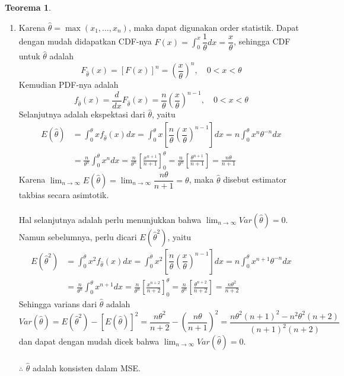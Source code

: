 \documentclass{exam}
\newtheorem{teorema}{Teorema}
\begin{document}
\begin{enumerate}
\begin{solution}
\begin{itemize}
\begin{teorema}
            \end{teorema}
        \end{itemize}
        \begin{enumerate}
            \item Karena $\hat{\theta} = \max(x_1,\dots,x_n)$, maka dapat digunakan order statistik. Dapat dengan mudah didapatkan CDF-nya $\displaystyle F(x) = \int_0^x \dfrac{1}{\theta}dx = \dfrac{x}{\theta}$, sehingga CDF untuk $\hat{\theta}$ adalah
            \[F_{\hat{\theta}}(x) = [F(x)]^n = \left(\dfrac{x}{\theta}\right)^n, \quad 0 < x < \theta\]
            Kemudian PDF-nya adalah
            \[f_{\hat{\theta}}(x) = \dfrac{d}{dx}F_{\hat{\theta}}(x) = \dfrac{n}{\theta}\left(\dfrac{x}{\theta}\right)^{n-1}, \quad 0 < x < \theta\]
            Selanjutnya adalah ekspektasi dari $\hat{\theta}$, yaitu
            \begin{align*}
                E(\hat{\theta}) &= \int_0^\theta x f_{\hat{\theta}}(x)dx = \int_0^\theta x\left[\dfrac{n}{\theta}\left(\dfrac{x}{\theta}\right)^{n-1}\right]dx = n\int_0^\theta x^n\theta^{-n}dx\\
                &= \frac{n}{\theta^n}\int_0^\theta x^ndx = \frac{n}{\theta^n}\left[\frac{x^{n+1}}{n+1}\right]_0^\theta = \frac{n}{\theta^n}\left[\frac{\theta^{n+1}}{n+1}\right] = \frac{n\theta}{n+1}
            \end{align*}
            Karena $\displaystyle\lim_{n\to\infty}E(\hat{\theta})=\lim_{n\to\infty}\dfrac{n\theta}{n+1} = \theta$, maka $\hat{\theta}$ disebut estimator takbias secara asimtotik.\\~\\
            Hal selanjutnya adalah perlu menunjukkan bahwa $\displaystyle\lim_{n\to\infty}Var(\hat{\theta})=0$. Namun sebelumnya, perlu dicari $E(\hat{\theta}^2)$, yaitu
            \begin{align*}
                E(\hat{\theta}^2) &= \int_0^\theta x^2 f_{\hat{\theta}}(x)dx = \int_0^\theta x^2\left[\dfrac{n}{\theta}\left(\dfrac{x}{\theta}\right)^{n-1}\right]dx = n\int_0^\theta x^{n+1}\theta^{-n}dx\\
                &= \frac{n}{\theta^n}\int_0^\theta x^{n+1}dx = \frac{n}{\theta^n}\left[\frac{x^{n+2}}{n+2}\right]_0^\theta = \frac{n}{\theta^n}\left[\frac{\theta^{n+2}}{n+2}\right] = \frac{n\theta^2}{n+2}
            \end{align*}
            Sehingga varians dari $\hat{\theta}$ adalah
            \[Var(\hat{\theta}) = E(\hat{\theta}^2) - [E(\hat{\theta})]^2 = \frac{n\theta^2}{n+2} - \left(\frac{n\theta}{n+1}\right)^2 = \frac{n\theta^2(n+1)^2 - n^2\theta^2(n+2)}{(n+1)^2(n+2)}\]
            dan dapat dengan mudah dicek bahwa $\displaystyle\lim_{n\to\infty}Var(\hat{\theta})=0$.\\~\\
            $\therefore$ $\hat{\theta}$ adalah konsisten dalam MSE.


\end{enumerate}
\end{solution}
\end{enumerate}
\end{document}
